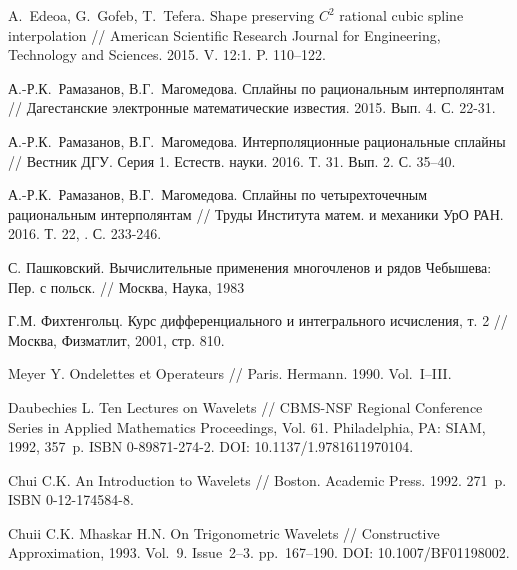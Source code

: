 \begin{thebibliography}{999}

  A.~Edeoa, G.~Gofeb, T.~Tefera.  Shape preserving $C^2$ rational cubic spline interpolation //
 American Scientific Research Journal for Engineering, Technology and Sciences. 2015. V. 12:1. P. 110--122.




 А.-Р.К.~Рамазанов, В.Г.~Магомедова. Сплайны по рациональным интерполянтам // Дагестанские
электронные математические известия. 2015. Вып. 4. С. 22-31.




 А.-Р.К.~Рамазанов, В.Г.~Магомедова. Интерполяционные рациональные сплайны // Вестник ДГУ. Серия 1. Естеств. науки. 2016.
Т. 31. Вып. 2. С. 35--40.




 А.-Р.К.~Рамазанов, В.Г.~Магомедова. Сплайны по четырехточечным рациональным интерполянтам //
Труды Института матем. и механики УрО РАН. 2016. Т. 22, . С. 233-246.




 С. Пашковский. Вычислительные применения многочленов и рядов Чебышева: Пер. с польск. // Москва, Наука, 1983



 Г.М. Фихтенгольц. Курс дифференциального и интегрального исчисления, т. 2 // Москва, Физматлит, 2001, стр. 810.





 Meyer Y. Ondelettes et Operateurs // Paris. Hermann. 1990. Vol.~I–III.




 Daubechies L. Ten Lectures on Wavelets // CBMS-NSF Regional Conference Series in Applied Mathematics Proceedings,
Vol. 61. Philadelphia, PA: SIAM, 1992, 357~p. ISBN 0-89871-274-2. DOI: 10.1137/1.9781611970104.




 Chui C.K. An Introduction to  Wavelets // Boston. Academic Press. 1992. 271~p. ISBN 0-12-174584-8.




 Chuii C.K. Mhaskar H.N. On Trigonometric Wavelets // Constructive Approximation, 1993. Vol.~9. Issue~2--3. pp.~167--190. DOI: 10.1007/BF01198002.




\end{thebibliography}
